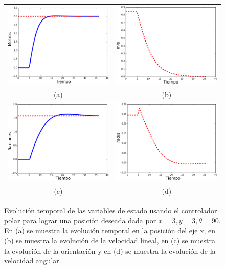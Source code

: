 \begin{figure}[ht!]
  \begin{tabular}{cc}
    \includegraphics[width=.47\textwidth]{images/tvsxy_tesis.eps}&
    \includegraphics[width=.47\textwidth]{images/tvsv_tesis.eps}\\
    (a)&(b)\\
    \includegraphics[width=.47\textwidth]{images/tvstheta_tesis.eps}&
    \includegraphics[width=.47\textwidth]{images/tvsomega_tesis.eps}\\
    (c)&(d)
  \end{tabular}
  \caption{Evolución temporal de las variables de estado usando el controlador polar para 
  lograr una posición deseada dada por $x = 3, y = 3, \theta = 90$. En (a) se muestra la 
  evolución temporal en la posición del eje x, en (b) se muestra la evolución de la 
  velocidad lineal, en (c) se muestra la evolución de la orientación y en (d) se muestra 
  la evolución de la velocidad angular.}
  \label{f:PolarControl}
\end{figure}


